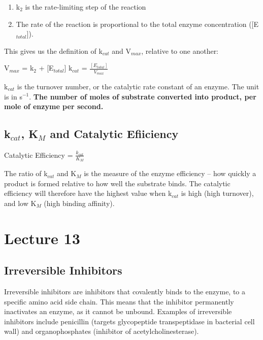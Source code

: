 \documentclass[a4paper, 12pt]{report}
\newcommand{\mychapter}[2]{
    \setcounter{chapter}{#1}
    \setcounter{section}{0}
    \chapter*{#2}
    \addcontentsline{toc}{chapter}{#2}
}
\begin{document}
\begin{center}
\end{center}

\begin{enumerate}
\item k$_2$ is the rate-limiting step of the reaction
\item The rate of the reaction is proportional to the total enzyme concentration ([E$_{total}$]).
\end{enumerate}

This gives us the definition of k$_{cat}$ and V$_{max}$, relative to one another:

\begin{center}
V$_{max}$ = k$_2$ + [E$_{total}$] \ch{->} k$_{cat}$ = $\frac{[E_{total}]}{V_{max}}$
\end{center}

k$_{cat}$ is the turnover number, or the catalytic rate constant of an enzyme.
The unit is in s$^{-1}$.
\textbf{The number of moles of substrate converted into product, per mole of enzyme per second.}

\section{k$_{cat}$, K$_M$ and Catalytic Efiiciency}

\begin{center}
Catalytic Efficiency = $\frac{k_{cat}}{K_M}$
\end{center}

The ratio of k$_{cat}$ and K$_M$ is the measure of the enzyme efficiency -- how quickly a product is formed relative to how well the substrate binds.
The catalytic efficiency will therefore have the highest value when k$_{cat}$ is high (high turnover), and low K$_M$ (high binding affinity).

\mychapter{13}{Lecture 13}

\section{Irreversible Inhibitors}

Irreversible inhibitors are inhibitors that covalently binds to the enzyme, to a specific amino acid side chain.
This means that the inhibitor permanently inactivates an enzyme, as it cannot be unbound.
Examples of irreversible inhibitors include penicillin (targets glycopeptide transpeptidase in bacterial cell wall) and organophosphates (inhibitor of acetylcholinesterase).
\end{document}
